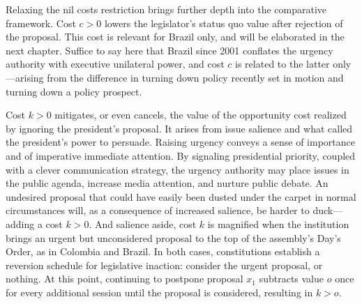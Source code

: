 \documentclass[letter,12pt]{article}
\begin{document}
Relaxing the nil costs restriction brings further depth into the comparative framework. Cost $c>0$ lowers the legislator's status quo value after rejection of the proposal. This cost is relevant for Brazil only, and will be elaborated in the next chapter. Suffice to say here that Brazil since 2001 conflates the urgency authority with executive unilateral power, and cost $c$ is related to the latter only---arising from the difference in turning down policy recently set in motion and turning down a policy prospect. 


Cost $k>0$ mitigates, or even cancels, the value of the opportunity cost realized by ignoring the president's proposal. It arises from issue salience and what \citet{neustadt.1990} called the president's power to persuade. Raising urgency conveys a sense of importance and of imperative immediate attention. By signaling presidential priority, coupled with a clever communication strategy, the urgency authority may place issues in the public agenda, increase media attention, and nurture public debate. An undesired proposal that could have easily been dusted under the carpet in normal circumstances will, as a consequence of increased salience, be harder to duck---adding a cost $k>0$. And salience aside, cost $k$ is magnified when the institution brings an urgent but unconsidered proposal to the top of the assembly's Day's Order, as in Colombia and Brazil. In both cases, constitutions establish a reversion schedule for legislative inaction: consider the urgent proposal, or nothing. At this point, continuing to postpone proposal $x_1$ subtracts value $o$ once for every additional session until the proposal is considered, resulting in $k>o$. 
\end{document}
